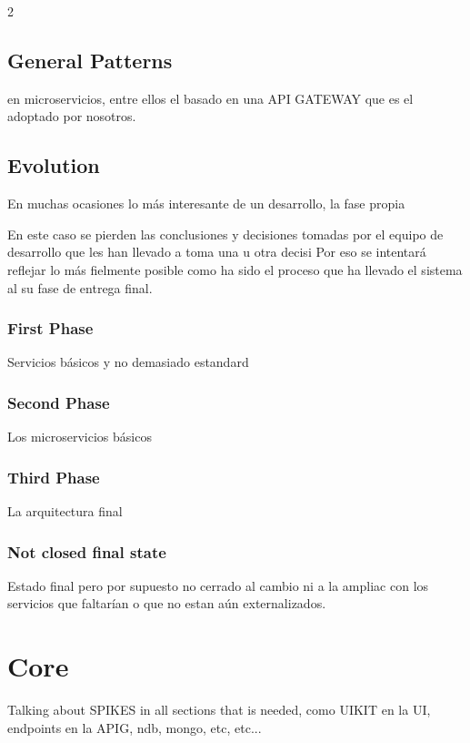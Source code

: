 \documentclass[oneside,english,titlepage]{scrbook}
\begin{document}
2

\section{General Patterns}


en microservicios, entre ellos el basado en una API GATEWAY que es
el adoptado por nosotros.

\section{Evolution}

En muchas ocasiones lo más interesante de un desarrollo, la fase propia

En este caso se pierden las conclusiones y decisiones tomadas por
el equipo de desarrollo que les han llevado a toma una u otra decisi
Por eso se intentará reflejar lo más fielmente posible como ha sido
el proceso que ha llevado el sistema al su fase de entrega final.

\subsection{First Phase}

Servicios básicos y no demasiado estandard

\subsection{Second Phase}

Los microservicios básicos

\subsection{Third Phase}

La arquitectura final

\subsection{Not closed final state}

Estado final pero por supuesto no cerrado al cambio ni a la ampliac
con los servicios que faltarían o que no estan aún externalizados.

\chapter{Core}

Talking about SPIKES in all sections that is needed, como UIKIT en
la UI, endpoints en la APIG, ndb, mongo, etc, etc...
\end{document}
